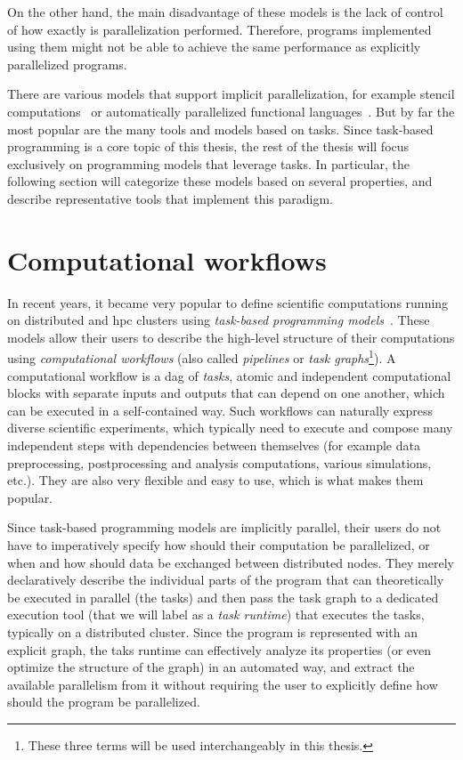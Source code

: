On the other hand, the main disadvantage of these models is the lack of control of how exactly is
parallelization performed. Therefore, programs implemented using them might not be able to achieve
the same performance as explicitly parallelized programs.

There are various models that support implicit parallelization, for example stencil
computations~\cite{stencil} or automatically parallelized functional
languages~\cite{parallel_haskell}. But by far the most popular are the many tools and models based
on tasks. Since task-based programming is a core topic of this thesis, the rest of the thesis will
focus exclusively on programming models that leverage tasks. In particular, the following section
will categorize these models based on several properties, and describe representative tools that
implement this paradigm.

\section{Computational workflows}
In recent years, it became very popular to define scientific computations running on distributed
and \gls{hpc} clusters using \emph{task-based programming models}~\cite{pegasus,workflows1,workflows_at_scale}. These
models allow their users to describe the high-level structure of their computations using
\emph{computational workflows} (also called \emph{pipelines} or \emph{task graphs}\footnote{These three terms will be used interchangeably in this thesis.}). A computational workflow is a \gls{dag} of
\emph{tasks}, atomic and independent computational blocks with separate inputs and
outputs that can depend on one another, which can be executed in a self-contained way. Such
workflows can naturally express diverse scientific experiments, which typically need to execute and
compose many independent steps with dependencies between themselves (for example data
preprocessing, postprocessing and analysis computations, various simulations, etc.). They are also
very flexible and easy to use, which is what makes them popular.

Since task-based programming models are implicitly parallel, their users do not have to
imperatively specify how should their computation be parallelized, or when and how should data be
exchanged between distributed nodes. They merely declaratively describe the individual parts of the
program that can theoretically be executed in parallel (the tasks) and then pass the task graph to
a dedicated execution tool (that we will label as a \emph{task runtime}) that executes the
tasks, typically on a distributed cluster. Since the program is represented with an explicit graph,
the taks runtime can effectively analyze its properties (or even optimize the structure of the
graph) in an automated way, and extract the available parallelism from it without requiring the
user to explicitly define how should the program be parallelized.

